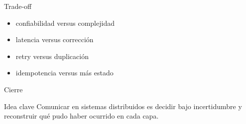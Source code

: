 \documentclass[institutional,screen,none]{ua-engineering-v6-beamer}
\begin{document}
\begin{frame}{Trade-off}
\begin{itemize}
\item confiabilidad versus complejidad
\item latencia versus corrección
\item retry versus duplicación
\item idempotencia versus más estado
\end{itemize}
\end{frame}

\begin{frame}{Cierre}
\begin{block}{Idea clave}
Comunicar en sistemas distribuidos es decidir bajo incertidumbre y reconstruir qué pudo haber ocurrido en cada capa.
\end{block}
\end{frame}
\end{document}
